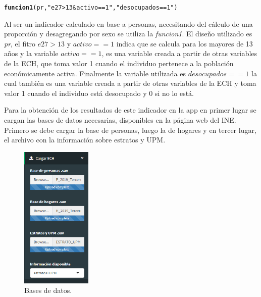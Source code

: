 \documentclass[12pt,twoside,spanish,a4paper]{book}\usepackage[]{graphicx}\usepackage[]{color}
\makeatletter
\newcommand{\hlstr}[1]{\textcolor[rgb]{0.192,0.494,0.8}{#1}}%
\newcommand{\hlstd}[1]{\textcolor[rgb]{0.345,0.345,0.345}{#1}}%
\newcommand{\hlkwd}[1]{\textcolor[rgb]{0.737,0.353,0.396}{\textbf{#1}}}%
\newenvironment{kframe}{%
 \def\at@end@of@kframe{}%
 \ifinner\ifhmode%
  \def\at@end@of@kframe{\end{minipage}}%
  \begin{minipage}{\columnwidth}%
 \fi\fi%
 \def\FrameCommand##1{\hskip\@totalleftmargin \hskip-\fboxsep
 \colorbox{shadecolor}{##1}\hskip-\fboxsep
     \hskip-\linewidth \hskip-\@totalleftmargin \hskip\columnwidth}%
 \MakeFramed {\advance\hsize-\width
   \@totalleftmargin\z@ \linewidth\hsize
   \@setminipage}}%
 {\par\unskip\endMakeFramed%
 \at@end@of@kframe}
\newenvironment{knitrout}{}{} %
\makeatother
\begin{document}
\begin{knitrout}
\color{fgcolor}\begin{kframe}
\begin{alltt}
\hlkwd{funcion1}\hlstd{(pr,} \hlstr{"e27>13 & activo==1"}\hlstd{,} \hlstr{"desocupados==1"}\hlstd{)}
\end{alltt}
\end{kframe}
\end{knitrout}

Al ser un indicador calculado en base a personas, necesitando del cálculo de una proporción y desagregando por sexo se utiliza la \textit{funcion1}. El diseño utilizado es \textit{pr}, el fitro $e27>13$ y $activo==1$ indica que se calcula para los mayores de 13 años y la variable $activo==1$, es una variable creada a partir de otras variables de la ECH, que toma valor 1 cuando el individuo pertenece a la población económicamente activa. Finalmente la variable utilizada es $desocupados==1$ la cual también es una variable creada a partir de otras variables de la ECH y toma valor 1 cuando el individuo está desocupado y 0 si no lo está.

Para la obtención de los resultados de este indicador en la app en primer lugar se cargan las bases de datos necesarias, disponibles en la página web del INE. Primero se debe cargar la base de personas, luego la de hogares y en tercer lugar, el archivo con la información sobre estratos y UPM.

\begin{figure}[H]
\begin{center}
\includegraphics[width=0.30\textwidth]{img/bases.PNG}
\caption{Bases de datos. \label{pest}}
\end{center}
\end{figure}
\end{document}
